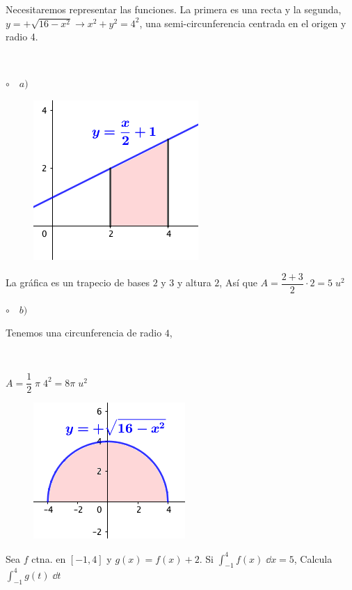 \begin{proofw}\renewcommand{\qedsymbol}{$\diamond$}	

Necesitaremos representar las funciones. La primera es una recta y la segunda, $y=+\sqrt{16-x^2}\to x^2+y^2=4^2$, una semi-circunferencia centrada en el origen y radio 4.
$\quad$

$\quad$

$\circ \quad a)$

\begin{multicols}{2}
	\begin{figure}[H]
	\centering
	\includegraphics[width=.25\textwidth]{imagenes/imagenes08/T08IM26.png}
	\end{figure}
	\small{La gráfica es un trapecio de bases $2$ y $3$ y altura $2$, Así que}  $A=\dfrac {2+3}{2}\cdot 2=5\; u^2$
\end{multicols}

$\circ \quad b)$

\begin{multicols}{2}

\normalsize{Tenemos una circunferencia de radio $4$,} 

	$\quad $

	$A= \dfrac 1 2 \; \pi \; 4^2= 8 \pi \; u^2$

	\begin{figure}[H]
	\centering
	\includegraphics[width=.25\textwidth]{imagenes/imagenes08/T08IM27.png}
	\end{figure}
\end{multicols}
	
\end{proofw}

\begin{ejre}
	Sea $f$ ctna. en $[-1,4]$ y $g(x)=f(x)+2$. Si $\displaystyle \int_{-1}^4 f(x)\; \dd x =5$, Calcula $\displaystyle \int_{-1}^4 g(t)\; \dd t$
\end{ejre}


